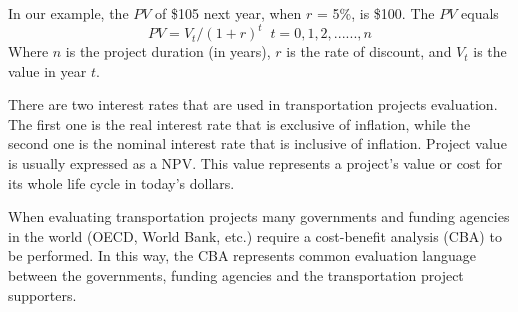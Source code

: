 \par
In our example, the $PV$ of \$105 next year, when $r$ = 5\%, is \$100. The $PV$ equals
\begin{equation}
	PV = V_t/(1 + r)^t \; \; t = 0, 1, 2,......,n
\end{equation}
Where $n$ is the project duration (in years), $r$ is the rate of discount, and $V_t$ is the value in year $t$.\\
\par
There are two interest rates that are used in transportation projects evaluation. The first one is the real interest rate that is exclusive of inflation, while the second one is the nominal interest rate that is inclusive of inflation. Project value is usually expressed as a NPV. This value represents a project’s value or cost for its whole life cycle in today’s dollars.\\
\par
When evaluating transportation projects many governments and funding agencies in the world (OECD, World Bank, etc.) require a cost-benefit analysis (CBA) to be performed. In this way, the CBA represents common evaluation language between the governments, funding agencies and the transportation project supporters.\\
